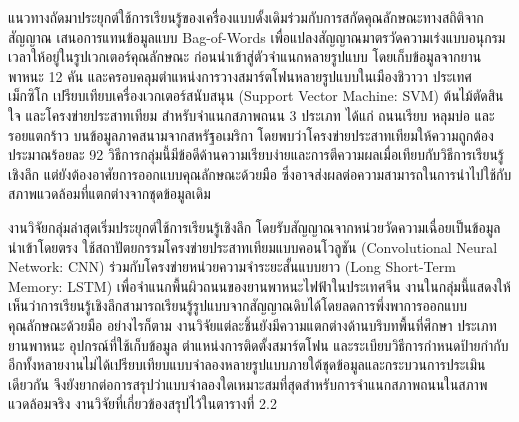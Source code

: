 แนวทางถัดมาประยุกต์ใช้การเรียนรู้ของเครื่องแบบดั้งเดิมร่วมกับการสกัดคุณลักษณะทางสถิติจากสัญญาณ \textcite{gonzalez2017} เสนอการแทนข้อมูลแบบ Bag-of-Words เพื่อแปลงสัญญาณมาตรวัดความเร่งแบบอนุกรมเวลาให้อยู่ในรูปเวกเตอร์คุณลักษณะ ก่อนนำเข้าสู่ตัวจำแนกหลายรูปแบบ โดยเก็บข้อมูลจากยานพาหนะ 12 คัน และครอบคลุมตำแหน่งการวางสมาร์ตโฟนหลายรูปแบบในเมืองชิวาวา ประเทศเม็กซิโก \textcite{basavaraju2020} เปรียบเทียบเครื่องเวกเตอร์สนับสนุน (Support Vector Machine: SVM) ต้นไม้ตัดสินใจ และโครงข่ายประสาทเทียม สำหรับจำแนกสภาพถนน 3 ประเภท ได้แก่ ถนนเรียบ หลุมบ่อ และรอยแตกร้าว บนข้อมูลภาคสนามจากสหรัฐอเมริกา โดยพบว่าโครงข่ายประสาทเทียมให้ความถูกต้องประมาณร้อยละ 92 วิธีการกลุ่มนี้มีข้อดีด้านความเรียบง่ายและการตีความผลเมื่อเทียบกับวิธีการเรียนรู้เชิงลึก แต่ยังต้องอาศัยการออกแบบคุณลักษณะด้วยมือ ซึ่งอาจส่งผลต่อความสามารถในการนำไปใช้กับสภาพแวดล้อมที่แตกต่างจากชุดข้อมูลเดิม

งานวิจัยกลุ่มล่าสุดเริ่มประยุกต์ใช้การเรียนรู้เชิงลึก โดยรับสัญญาณจากหน่วยวัดความเฉื่อยเป็นข้อมูลนำเข้าโดยตรง \textcite{yu2024} ใช้สถาปัตยกรรมโครงข่ายประสาทเทียมแบบคอนโวลูชัน (Convolutional Neural Network: CNN) ร่วมกับโครงข่ายหน่วยความจำระยะสั้นแบบยาว (Long Short-Term Memory: LSTM) เพื่อจำแนกพื้นผิวถนนของยานพาหนะไฟฟ้าในประเทศจีน งานในกลุ่มนี้แสดงให้เห็นว่าการเรียนรู้เชิงลึกสามารถเรียนรู้รูปแบบจากสัญญาณดิบได้โดยลดการพึ่งพาการออกแบบคุณลักษณะด้วยมือ อย่างไรก็ตาม งานวิจัยแต่ละชิ้นยังมีความแตกต่างด้านบริบทพื้นที่ศึกษา ประเภทยานพาหนะ อุปกรณ์ที่ใช้เก็บข้อมูล ตำแหน่งการติดตั้งสมาร์ตโฟน และระเบียบวิธีการกำหนดป้ายกำกับ อีกทั้งหลายงานไม่ได้เปรียบเทียบแบบจำลองหลายรูปแบบภายใต้ชุดข้อมูลและกระบวนการประเมินเดียวกัน จึงยังยากต่อการสรุปว่าแบบจำลองใดเหมาะสมที่สุดสำหรับการจำแนกสภาพถนนในสภาพแวดล้อมจริง งานวิจัยที่เกี่ยวข้องสรุปไว้ในตารางที่ 2.2

